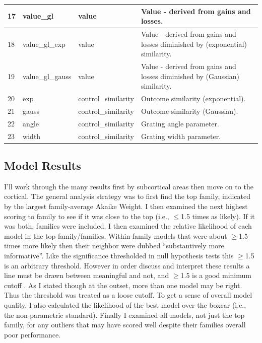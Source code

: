 \begin{center}
\begin{longtable}{ | l | l | l | p{6cm} |}
        17 & value\_gl & value & Value - derived from gains and losses. \\ \hline
        18 & value\_gl\_exp & value & Value - derived from gains and losses diminished by (exponential) similarity. \\ \hline
        19 & value\_gl\_gauss & value & Value - derived from gains and losses diminished by (Gaussian) similarity. \\ \hline 
        20 & exp & control\_similarity & Outcome similarity (exponential). \\ \hline
        21 & gauss & control\_similarity & Outcome similarity (Gaussian). \\ \hline
        22 & angle & control\_similarity & Grating angle parameter. \\ \hline
        23 &width & control\_similarity & Grating width parameter. \\ \hline
    \end{longtable}
\end{center}


\subsection{Model Results}
\label{sub:modelresults}
I'll work through the many results first by subcortical areas then move on to the cortical.  The general analysis strategy was to first find the top family, indicated by the largest family-average Akaike Weight.  I then examined the next highest scoring to family to see if it was close to the top (i.e., $\le$1.5 times as likely).  If it was both, families were included.  I then examined the relative likelihood of each model in the top family/families.  Within-family models that were about $\ge$1.5 times more likely then their neighbor were dubbed ``substantively more informative''.  Like the significance thresholded in null hypothesis tests this $\ge$1.5 is an arbitrary threshold.  However in order discuss and interpret these results a line must be drawn between meaningful and not, and $\ge$1.5 is a good minimum cutoff \cite{Anderson:2000p9475, Forster:2000p9623}.  As I stated though at the outset, more than one model may be right.  Thus the threshold was treated as a loose cutoff.  To get a sense of overall model quality, I also calculated the likelihood of the best model over the boxcar (i.e., the non-parametric standard).  Finally I examined all models, not just the top family, for any outliers that may have scored well despite their families overall poor performance.

